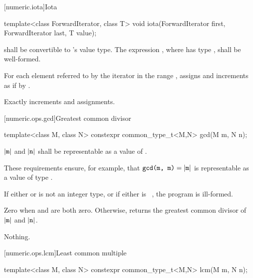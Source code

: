 [numeric.iota]{Iota}

%
\begin{itemdecl}
template<class ForwardIterator, class T>
  void iota(ForwardIterator first, ForwardIterator last, T value);
\end{itemdecl}

\begin{itemdescr}
\pnum
\requires {} shall be convertible to 's value
type. The expression , where  has type , shall
be well-formed.

\pnum
\effects For each element referred to by the iterator  in the range
, assigns  and increments  as
if by .

\pnum
\complexity Exactly  increments and assignments.
\end{itemdescr}

[numeric.ops.gcd]{Greatest common divisor}

%
\begin{itemdecl}
template<class M, class N>
  constexpr common_type_t<M,N> gcd(M m, N n);
\end{itemdecl}

\begin{itemdescr}
\pnum
\requires
$|\texttt{m}|$ and $|\texttt{n}|$ shall
be representable as a value of .
\begin{note} These requirements ensure, for example,
that $\texttt{gcd(m, m)} = |\texttt{m}|$ is representable as a value of type . \end{note}

\pnum
\remarks
If either  or  is not an integer type, or
if either is \cv{}~, the program is ill-formed.

\pnum
\returns
Zero when  and  are both zero.
Otherwise, returns the greatest common divisor of $|\texttt{m}|$ and $|\texttt{n}|$.

\pnum
\throws
Nothing.
\end{itemdescr}

[numeric.ops.lcm]{Least common multiple}

%
\begin{itemdecl}
template<class M, class N>
  constexpr common_type_t<M,N> lcm(M m, N n);
\end{itemdecl}

